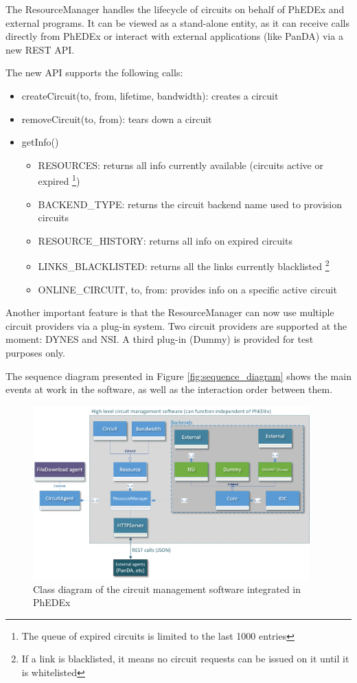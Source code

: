 The ResourceManager handles the lifecycle of circuits on behalf of PhEDEx and external programs.
It can be viewed as a stand-alone entity, as it can receive calls directly from PhEDEx or 
interact with external applications (like PanDA\cite{PANDA}) via a new REST API.

The new API supports the following calls:
\begin{itemize}
  \item createCircuit(to, from, lifetime, bandwidth): creates a circuit
  \item removeCircuit(to, from): tears down a circuit
  \item getInfo()
	\begin{itemize}
		\item RESOURCES: returns all info currently available (circuits active or expired
		\footnote{The queue of expired circuits is limited to the last 1000 entries})
		\item BACKEND\_TYPE: returns the circuit backend name used to provision circuits
		\item RESOURCE\_HISTORY: returns all info on expired circuits
		\item LINKS\_BLACKLISTED: returns all the links currently blacklisted
		\footnote{If a link is blacklisted, it means no circuit requests can be issued on it
		until it is whitelisted}
		\item ONLINE\_CIRCUIT, to, from: provides info on a specific active circuit
	\end{itemize}
\end{itemize}

Another important feature is that the ResourceManager can now use multiple circuit
providers via a plug-in system. Two circuit providers are supported at the moment: 
DYNES and NSI\cite{NSI}.
A third plug-in (Dummy) is provided for test purposes only.

The sequence diagram presented in Figure \ref{fig:sequence_diagram} shows the main events
at work in the software, as well as the interaction order  between them.

\begin{figure}[h]
  \centering
  \includegraphics[width=0.95\textwidth]{Figures/Circuit_framework-class_diagram.png}
  \caption{Class diagram of the circuit management software integrated in PhEDEx}
  \label{fig:class_diagram}
\end{figure} 

